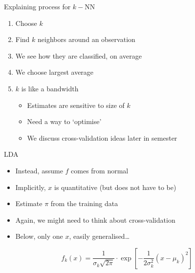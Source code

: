 \documentclass[
  ignorenonframetext,
]{beamer}
\providecommand{\tightlist}{%
  \setlength{\itemsep}{0pt}\setlength{\parskip}{0pt}}
\begin{document}
\begin{frame}{Explaining process for \(k-\)NN}
\protect{}\label{explaining-process-for-k-nn}
\begin{enumerate}
\tightlist
\item
  Choose \(k\)
\item
  Find \(k\) neighbors around an observation
\item
  We see how they are classified, on average
\item
  We choose largest average
\item
  \(k\) is like a bandwidth

  \begin{itemize}
  \tightlist
  \item
    Estimates are sensitive to size of \(k\)
  \item
    Need a way to `optimise'
  \item
    We discuss cross-validation ideas later in semester
  \end{itemize}
\end{enumerate}
\end{frame}

\begin{frame}{LDA}
\protect{}\label{lda}
\begin{itemize}
\tightlist
\item
  Instead, assume \(f\) comes from normal
\item
  Implicitly, \(x\) is quantitative (but does not have to be)
\item
  Estimate \(\pi\) from the training data
\item
  Again, we might need to think about cross-validation
\item
  Below, only one \(x\), easily generalised\ldots{}
\end{itemize}

\[
f_k(x) = \frac{1}{\sigma_k \sqrt{2\pi}} \cdot \exp \left[ -\frac{1}{2\sigma^2_k} \left(x - \mu_k \right)^2 \right]
\]
\end{frame}
\end{document}
